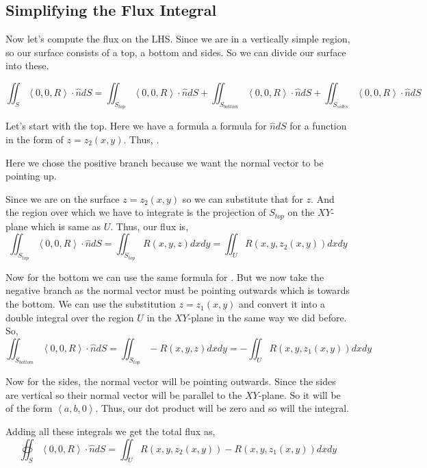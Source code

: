 \subsection{Simplifying the Flux Integral}

Now let's compute the flux on the LHS.
Since we are in a vertically simple region, so our surface consists of a top, a bottom and sides.
So we can divide our surface into these.

$$
\iint_{S} \left< 0, 0, R \right> \cdot \hat{n} dS 
    = \iint_{S_{top}} \left< 0, 0, R \right> \cdot \hat{n} dS 
    + \iint_{S_{bottom}} \left< 0, 0, R \right> \cdot \hat{n} dS 
    + \iint_{S_{sides}} \left< 0, 0, R \right> \cdot \hat{n} dS 
$$

Let's start with the top. Here we have a formula a formula for $\hat{n}dS$ for a function in the form of $z = z_2(x, y)$.
Thus, .

Here we chose the positive branch because we want the normal vector to be pointing up.

Since we are on the surface $z = z_2(x, y)$ so we can substitute that for $z$.
And the region over which we have to integrate is the projection of $S_{top}$ on the $XY$-plane which is same as $U$.
Thus, our flux is,
$$
\iint_{S_{top}} \left< 0, 0, R \right> \cdot \hat{n} dS 
    = \iint_{S_{top}} R(x, y, z) dx dy
    = \iint_U R(x, y, z_2(x, y)) dx dy
$$


Now for the bottom we can use the same formula for .
But we now take the negative branch as the normal vector must be pointing outwards which is towards the bottom.
We can use the substitution $z = z_1(x, y)$ and convert it into a double integral over the region $U$ in the $XY$-plane in the same way we did before.
So,
$$
\iint_{S_{bottom}} \left< 0, 0, R \right> \cdot \hat{n} dS 
    = \iint_{S_{top}} - R(x, y, z) dx dy
    = - \iint_U R(x, y, z_1(x, y)) dx dy
$$

Now for the sides, the normal vector will be pointing outwards. 
Since the sides are vertical so their normal vector will be parallel to the $XY$-plane.
So it will be of the form $\left< a, b, 0 \right>$. 
Thus, our dot product will be zero and so will the integral.

Adding all these integrals we get the total flux as, 
$$
\oiint_S \left< 0, 0, R \right> \cdot \hat{n} dS = \iint_U R(x, y, z_2(x, y)) - R(x, y, z_1(x, y)) dx dy 
$$

